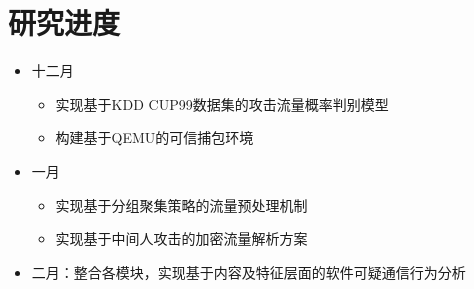 \section{研究进度}
\begin{frame}
    \begin{itemize}[<+->]
        \item 十二月
            \begin{itemize}[<+->]
                \item 实现基于KDD CUP99数据集的攻击流量概率判别模型
                \item 构建基于QEMU的可信捕包环境
            \end{itemize}
        \item 一月
            \begin{itemize}[<+->]
                \item 实现基于分组聚集策略的流量预处理机制
                \item 实现基于中间人攻击的加密流量解析方案
            \end{itemize}
        \item 二月：整合各模块，实现基于内容及特征层面的软件可疑通信行为分析
    \end{itemize}
    \nocite{*}
\end{frame}
